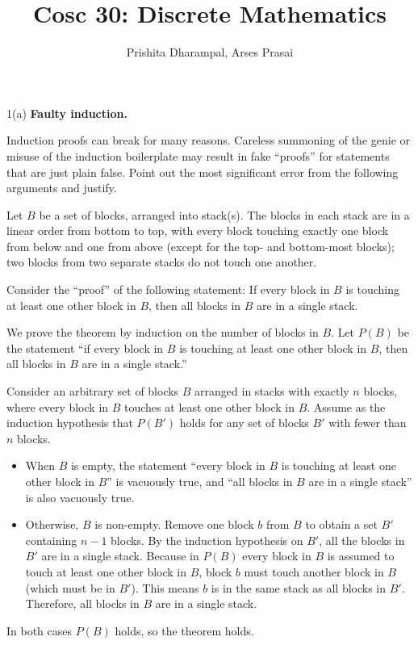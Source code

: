 \documentclass[12pt]{article}
\begin{document}
\title{Cosc 30: Discrete Mathematics}

\author{Prishita Dharampal, Arses Prasai}

\begin{problem}{1(a)}
    \textbf{Faulty induction.}  
    
    Induction proofs can break for many reasons. Careless summoning of the genie or misuse
    of the induction boilerplate may result in fake ``proofs'' for statements that are just plain false.
    Point out the most significant error from the following arguments and justify.

    Let $B$ be a set of blocks, arranged into stack(s). The blocks in each stack are in a linear
    order from bottom to top, with every block touching exactly one block from below and one
    from above (except for the top- and bottom-most blocks); two blocks from two separate stacks
    do not touch one another.

    Consider the ``proof'' of the following statement:  
    If every block in $B$ is touching at least one other block in $B$, then all blocks in $B$ are in
    a single stack.

    \begin{tcolorbox}
        We prove the theorem by induction on the number of blocks in $B$. Let $P(B)$ be the statement ``if every block in $B$ is touching at least one other block in $B$, then all blocks in $B$ are in a single stack.''

        Consider an arbitrary set of blocks $B$ arranged in stacks with exactly $n$ blocks, where
        every block in $B$ touches at least one other block in $B$. Assume as the induction hypothesis
        that $P(B')$ holds for any set of blocks $B'$ with fewer than $n$ blocks.
        \begin{itemize}
            \item When $B$ is empty, the statement ``every block in $B$ is touching at least one other block in $B$'' is vacuously true, and ``all blocks in $B$ are in a single stack'' is also vacuously true.
            \item Otherwise, $B$ is non-empty. Remove one block $b$ from $B$ to obtain a set $B'$ containing $n-1$ blocks. By the induction hypothesis on $B'$, all the blocks in $B'$ are in a single stack. Because in $P(B)$ every block in $B$ is assumed to touch at least one other block in $B$, block $b$ must touch another block in $B$ (which must be in $B'$). This means $b$ is in the same stack as all blocks in $B'$. Therefore, all blocks in $B$ are in a single stack.
        \end{itemize}
        In both cases $P(B)$ holds, so the theorem holds.
    \end{tcolorbox}
\end{problem}
\end{document}
